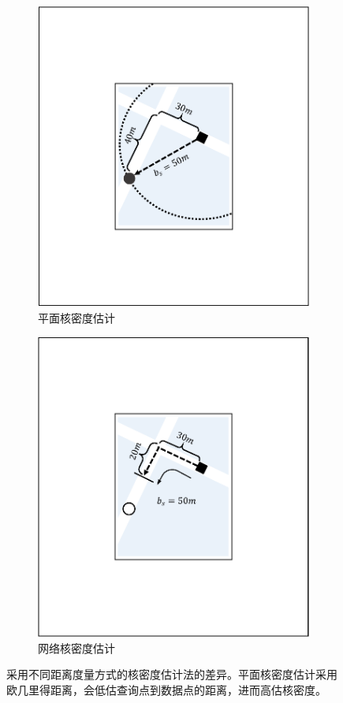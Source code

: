 \begin{itemize}[leftmargin=*]
	\begin{figure}[h!]
		\centering
		\begin{subfigure}{0.4\linewidth}
			\centering
			\includegraphics[width=0.8\linewidth]{figures/sec1_kde1.pdf}
			\caption{平面核密度估计}
			\label{subfig:loss_13}
		\end{subfigure}
		\hspace{1em}
		\begin{subfigure}{0.4\linewidth}
			\centering
			\includegraphics[width=0.8\linewidth]{figures/sec1_kde2.pdf}
			\caption{网络核密度估计}
			\label{subfig:loss_12}
		\end{subfigure}
		\caption{采用不同距离度量方式的核密度估计法的差异。平面核密度估计采用欧几里得距离，会低估查询点到数据点的距离，进而高估核密度。}
		\label{fig:kde_example}
	\end{figure}


\end{itemize}
